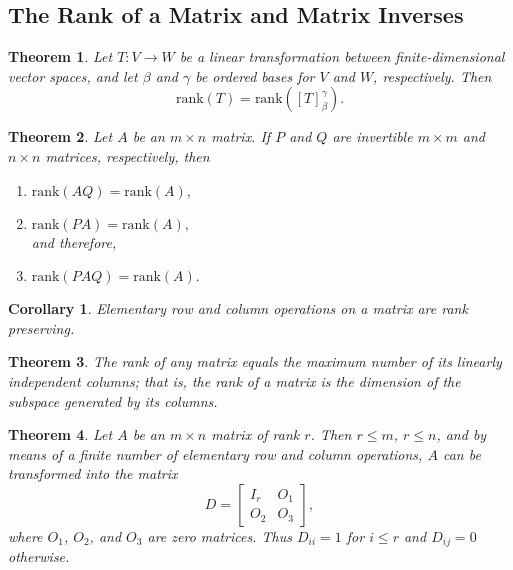 \documentclass{article}
\theoremstyle{plain}
\newtheorem{theorem}{Theorem}[section]
\newtheorem{corollary}{Corollary}[section]
\begin{document}
\subsection{The Rank of a Matrix and Matrix Inverses}
\begin{theorem}
    Let \( T: V \to W \) be a linear transformation between finite-dimensional vector spaces, and let \( \beta \) and \( \gamma \) be ordered bases for \( V \) and \( W \), respectively. Then 
\[
\text{rank}(T) = \text{rank}([T]_\beta^\gamma).
\]
\end{theorem}
\newpage
\begin{theorem}
    Let \( A \) be an \( m \times n \) matrix. If \( P \) and \( Q \) are invertible \( m \times m \) and \( n \times n \) matrices, respectively, then
\begin{enumerate}
    \item[(a)] \(\text{rank}(AQ) = \text{rank}(A),\)
    \item[(b)] \(\text{rank}(PA) = \text{rank}(A),\) \\
    and therefore,
    \item[(c)] \(\text{rank}(PAQ) = \text{rank}(A).\)
\end{enumerate}
\end{theorem}
\vspace{10cm}
\begin{corollary}
    Elementary row and column operations on a matrix are rank preserving.
\end{corollary}
\newpage
\begin{theorem}
    The rank of any matrix equals the maximum number of its linearly independent columns; that is, the rank of a matrix is the dimension of the subspace generated by its columns.
\end{theorem}
\vspace{7cm}
\begin{theorem}
    Let \( A \) be an \( m \times n \) matrix of rank \( r \). Then \( r \leq m \), \( r \leq n \), and by means of a finite number of elementary row and column operations, \( A \) can be transformed into the matrix
    \[
    D = \begin{bmatrix}
        I_r & O_1 \\
        O_2 & O_3
    \end{bmatrix},
    \]
    where \( O_1 \), \( O_2 \), and \( O_3 \) are zero matrices. Thus \( D_{ii} = 1 \) for \( i \leq r \) and \( D_{ij} = 0 \) otherwise.
\end{theorem}
\newpage
\end{document}
